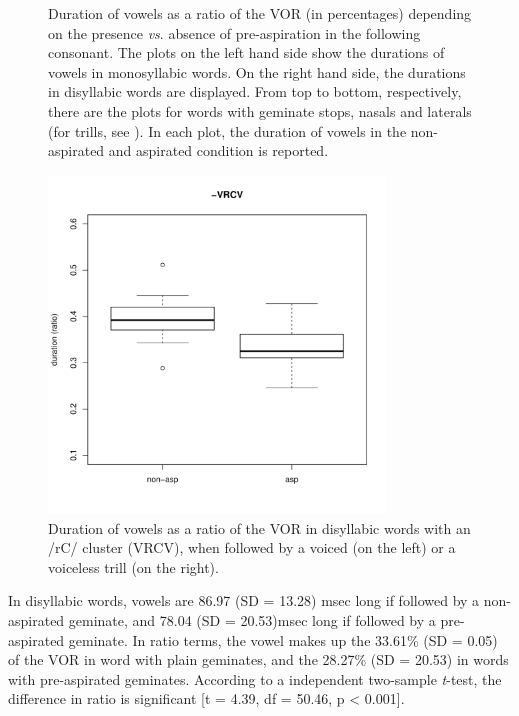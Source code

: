 \documentclass[11pt,a4paper,openany]{memoir}\usepackage[]{graphicx}\usepackage[]{color}
\newenvironment{knitrout}{}{} %
\begin{document}
\begin{figure}
\begin{subfigure}{.5\textwidth}
\begin{knitrout}
\end{knitrout}
\end{subfigure}
\caption{\scriptsize Duration of vowels as a ratio of the VOR (in percentages) depending on the presence \textit{vs}. absence of pre-aspiration in the following consonant.
The plots on the left hand side show the durations of vowels in monosyllabic words.
On the right hand side, the durations in disyllabic words are displayed.
From top to bottom, respectively, there are the plots for words with geminate stops, nasals and laterals (for trills, see ).
In each plot, the duration of vowels in the non-aspirated and aspirated condition is reported.
}
\label{f:vowelduration}
\end{figure}

\begin{figure}
\centering
\begin{knitrout}
\color{fgcolor}
\includegraphics[width=0.8\textwidth]{img/di-rho-box-1} 

\end{knitrout}
\caption{Duration of vowels as a ratio of the VOR in disyllabic words with an /rC/ cluster (VRCV), when followed by a voiced (on the left) or a voiceless trill (on the right).}
\label{f:voweldurrho}
\end{figure}



In disyllabic words, vowels are 86.97 (SD = 13.28) msec long if followed by a non-aspirated geminate, and 78.04 (SD = 20.53)msec long if followed by a pre-aspirated geminate.
In ratio terms, the vowel makes up the 33.61\% (SD = 0.05) of the VOR in word with plain geminates, and the 28.27\% (SD = 20.53) in words with pre-aspirated geminates.
According to a independent two-sample \textit{t}-test, the difference in ratio is significant [t = 4.39, df = 50.46, p < 0.001].
\end{document}
